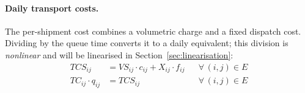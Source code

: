 
\paragraph{Daily transport costs.}
The per-shipment cost combines a volumetric charge and a fixed
dispatch cost. Dividing by the queue time converts it to a daily
equivalent; this division is \emph{nonlinear} and will be
linearised in Section~\ref{sec:linearisation}:
%
\begin{align}
  TCS_{ij}
  &= VS_{ij} \cdot c_{ij}
     + X_{ij} \cdot f_{ij}
  && \forall\,(i,j)\in E
  \label{eq:cost-ship}\\[4pt]
  TC_{ij} \cdot q_{ij}
  &= TCS_{ij}
  && \forall\,(i,j)\in E
  \label{eq:cost-daily}
\end{align}
